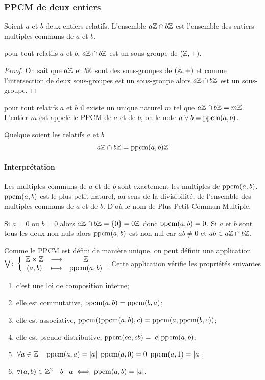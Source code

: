 \subsubsection{PPCM de deux entiers}

Soient \(a\) et \(b\) deux entiers relatifs. L'ensemble \(a\mathbb{Z} \cap b\mathbb{Z}\) est l'ensemble des entiers multiples communs de \(a\) et \(b\).
\begin{theo}
  pour tout relatifs \(a\) et \(b\), \(a\mathbb{Z} \cap b\mathbb{Z}\) est un sous-groupe de \((\mathbb{Z},+)\).
\end{theo}
\begin{proof}
  On sait que \(a\mathbb{Z}\) et \(b\mathbb{Z}\) sont des sous-groupes de \((\mathbb{Z},+)\) et comme l'intersection de deux sous-groupes est un sous-groupe alors \(a\mathbb{Z} \cap b\mathbb{Z}\) est un sous-groupe.
\end{proof}
\begin{corth}
  pour tout relatifs \(a\) et \(b\) il existe un unique naturel \(m\) tel que \(a\mathbb{Z} \cap b\mathbb{Z}= m \mathbb{Z}\). L'entier \(m\) est appelé le PPCM de \(a\) et de \(b\), on le note \(a \vee b = \operatorname{ppcm}(a,b)\).
\end{corth}
\begin{theo}
  Quelque soient les relatifs \(a\) et \(b\)
  \begin{equation}
    a\mathbb{Z} \cap b\mathbb{Z} = \operatorname{ppcm}(a,b) \mathbb{Z}
  \end{equation}
\end{theo}

\paragraph{Interprétation}

Les multiples communs de \(a\) et de \(b\) sont exactement les multiples de \(\operatorname{ppcm}(a,b)\). \(\operatorname{ppcm}(a,b)\) est le plus petit naturel, au sens de la divisibilité, de l'ensemble des multiples communs de \(a\) et de \(b\). D'où le nom de Plus Petit Commun Multiple.

Si \(a=0\) ou \(b=0\) alors \(a\mathbb{Z} \cap b\mathbb{Z} = \{0\}=0\mathbb{Z}\) donc \(\operatorname{ppcm}(a,b)=0\). Si \(a\) et \(b\) sont tous les deux non nuls alors \(\operatorname{ppcm}(a,b)\) est non nul car \(ab \neq 0\) et \(ab \in a\mathbb{Z} \cap b\mathbb{Z}\).

\begin{prop}
  Comme le PPCM est défini de manière unique, on peut définir une application \(\bigvee\colon \left\{\begin{array}{ccc} \mathbb{Z}\times\mathbb{Z} & \longrightarrow &\mathbb{Z}\\ (a,b) & \longmapsto & \operatorname{ppcm}(a,b) \end{array} \right.\). Cette application vérifie les propriétés suivantes
  \begin{enumerate}
  \item c'est une loi de composition interne;
  \item elle est commutative, \(\operatorname{ppcm}(a,b)=\operatorname{ppcm}(b,a)\);
  \item elle est associative, \(\operatorname{ppcm}((\operatorname{ppcm}(a,b),c)=\operatorname{ppcm}(a,\operatorname{ppcm}(b,c))\);
  \item elle est pseudo-distributive, \(\operatorname{ppcm}(ca,cb)=\left\lvert c\right\rvert\operatorname{ppcm}(a,b)\);
  \item \(\forall a \in \Z \quad \ppcm(a,a)=\abs{a} \ \ppcm(a,0) = 0 \ \ppcm(a,1)=\abs{a}\);
  \item \(\forall (a,b) \in \mathbb{Z}^2 \quad b\mid a \iff \operatorname{ppcm}(a,b)=\left\lvert a\right\rvert\).
  \end{enumerate}
\end{prop}

